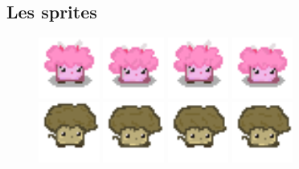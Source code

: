 \documentclass{article}
\begin{document}
\subsection{Les sprites}
\begin{figure}[h]
    \centering
    \includegraphics[height = 2cm]{risette/idle_0.png}
    \includegraphics[height = 2cm]{risette/idle_1.png}
    \includegraphics[height = 2cm]{risette/idle_2.png}
    \includegraphics[height = 2cm]{risette/idle_3.png}
    \\
    \includegraphics[height = 2cm]{brocoli/idle_0.png}
    \includegraphics[height = 2cm]{brocoli/idle_1.png}
    \includegraphics[height = 2cm]{brocoli/idle_2.png}
    \includegraphics[height = 2cm]{brocoli/idle_3.png}

\end{figure}
\end{document}
